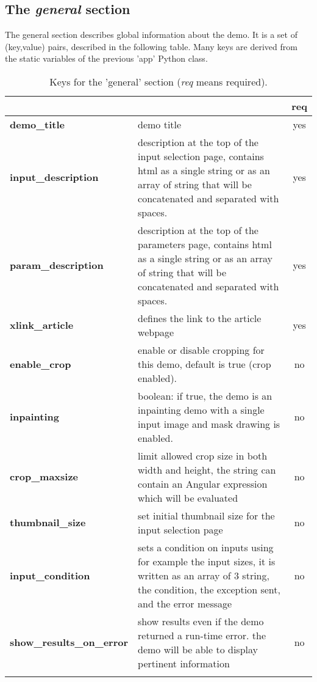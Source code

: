 
\subsection{The \emph{general} section}
The general section describes global information about the demo.
It is a set of  (key,value) pairs, described in the following table.
Many keys are derived from the static variables of the previous 'app' Python class.\\
% 
\begin{longtable}{|>{\bf}L{\linewidth}|L{\linewidth}|c|}
\hline
      &  & {\bf req} 
\tabularnewline \hline \hline
 demo\_title         & demo title & yes\\ \hline
 input\_description  & description at the top of the input selection page, 
                      contains html as a single string or as an array of string
                      that will be concatenated and separated with spaces.
                     & yes \\ \hline
 param\_description  & description at the top of the para\-meters page,
                      contains html as a single string or as an array of string
                      that will be concatenated and separated with spaces.
                      & yes
                      \\ \hline
 xlink\_article     & defines the link to the article webpage & yes  \\ \hline
 enable\_crop       & enable or disable cropping for this demo, default is true 
                      (crop enabled). & no   \\ \hline
 inpainting         & boolean: if true, the demo is an inpainting demo with a 
                      single input image and mask drawing is enabled. & no \\ \hline
 crop\_maxsize      & limit allowed crop size in both width and height, the string
                      can contain an Angular expression which will be evaluated & no \\ \hline
 thumbnail\_size    & set initial thumbnail size for the input selection page & no \\ \hline
 input\_condition   & sets a condition on inputs using for example the input sizes,
                      it is written as an array of 3 string, the condition,
                      the exception sent, and the error message& no \\ \hline
 show\_results\_on\-\_error & show results even if the demo returned a run-time error.
                    the demo will be able to display pertinent information & no \\ \hline
\caption{Keys for the 'general' section ({\em req} means required).}
\end{longtable}

